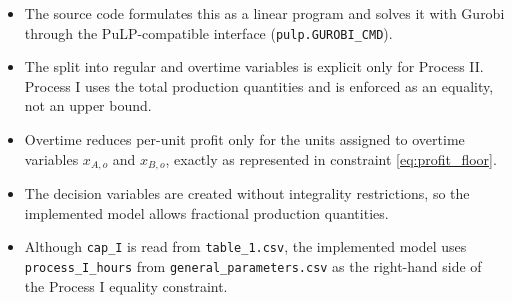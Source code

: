 \begin{itemize}
    \item The source code formulates this as a linear program and solves it with Gurobi through the PuLP-compatible interface (\texttt{pulp.GUROBI\_CMD}).
    \item The split into regular and overtime variables is explicit only for Process II. Process I uses the total production quantities and is enforced as an equality, not an upper bound.
    \item Overtime reduces per-unit profit only for the units assigned to overtime variables $x_{A,o}$ and $x_{B,o}$, exactly as represented in constraint \eqref{eq:profit_floor}.
    \item The decision variables are created without integrality restrictions, so the implemented model allows fractional production quantities.
    \item Although \texttt{cap\_I} is read from \texttt{table\_1.csv}, the implemented model uses \texttt{process\_I\_hours} from \texttt{general\_parameters.csv} as the right-hand side of the Process I equality constraint.
\end{itemize}
